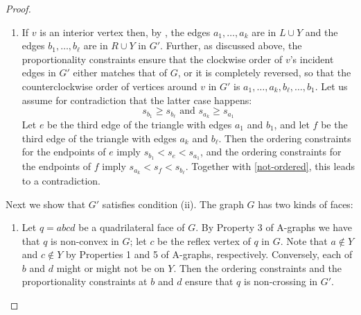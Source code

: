 \begin{proof}
\begin{enumerate}
\begin{enumerate}
			\item If $v$ is an interior vertex then, by , the edges $a_1,\ldots,a_k$ are in $L\cup Y$ and the edges $b_1,\ldots,b_\ell$ are in $R\cup Y$ in $G'$. Further, as discussed above, the proportionality constraints ensure that the clockwise order of $v$'s incident edges in $G'$ either matches that of $G$, or it is completely reversed, so that the counterclockwise order of vertices around $v$ in $G'$ is $a_1,\ldots,a_k,b_\ell,\ldots,b_1$. 	Let us assume for contradiction that the latter case happens:
			\begin{equation}
			\label{eq:not-ordered}
			s_{b_1}\ge s_{b_\ell}
			\text{ and }
			s_{a_k}\ge s_{a_1}
			\end{equation}
			Let $e$ be the third edge of the triangle with edges $a_1$ and $b_1$,
			and let 
			$f$ be the third edge of the triangle with edges $a_k$ and $b_\ell$.
			Then the ordering constraints for the endpoints of $e$ imply
			\begin{math}
			s_{b_1}<s_e<s_{a_1}
			\end{math},
			and the ordering constraints for the endpoints of $f$ imply
			\begin{math}
			s_{a_k}<s_f<s_{b_\ell}
			\end{math}.
			Together with \eqref{not-ordered}, this leads to a contradiction.
		\end{enumerate}
	\end{enumerate}
	
	Next we show that $G'$ satisfies condition (ii). The graph $G$ has two
	kinds of faces:
	\begin{enumerate}
		\item Let $q = abcd$ be a quadrilateral face of $G$. By Property 3 of A-graphs we have that $q$ is non-convex in $G$; let $c$ be the reflex vertex of $q$ in $G$. Note that $a\notin Y$ and $c\notin Y$ by Properties 1 and 5 of A-graphs, respectively. Conversely, each of $b$ and $d$ might or might not be on $Y$. Then the ordering constraints and the proportionality constraints at $b$ and $d$ ensure that $q$ is non-crossing in $G'$.
		
		

\end{enumerate}
\end{proof}
